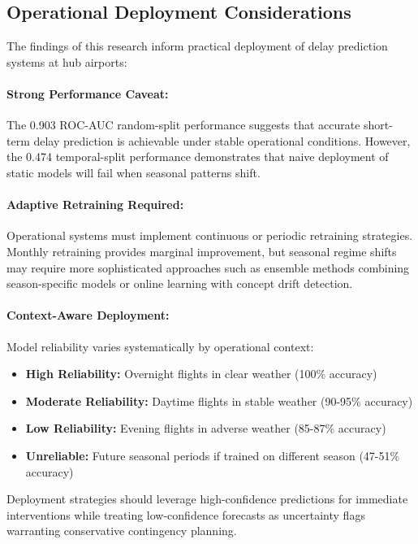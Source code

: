 \documentclass{report}
\begin{document}
\subsection{Operational Deployment Considerations}

The findings of this research inform practical deployment of delay prediction systems at hub airports:

\paragraph{Strong Performance Caveat:} The 0.903 ROC-AUC random-split performance suggests that accurate short-term delay prediction is achievable under stable operational conditions. However, the 0.474 temporal-split performance demonstrates that naive deployment of static models will fail when seasonal patterns shift.

\paragraph{Adaptive Retraining Required:} Operational systems must implement continuous or periodic retraining strategies. Monthly retraining provides marginal improvement, but seasonal regime shifts may require more sophisticated approaches such as ensemble methods combining season-specific models or online learning with concept drift detection.

\paragraph{Context-Aware Deployment:} Model reliability varies systematically by operational context:
\begin{itemize}
    \item \textbf{High Reliability:} Overnight flights in clear weather (100\% accuracy)
    \item \textbf{Moderate Reliability:} Daytime flights in stable weather (90-95\% accuracy)
    \item \textbf{Low Reliability:} Evening flights in adverse weather (85-87\% accuracy)
    \item \textbf{Unreliable:} Future seasonal periods if trained on different season (47-51\% accuracy)
\end{itemize}

Deployment strategies should leverage high-confidence predictions for immediate interventions while treating low-confidence forecasts as uncertainty flags warranting conservative contingency planning.
\end{document}

